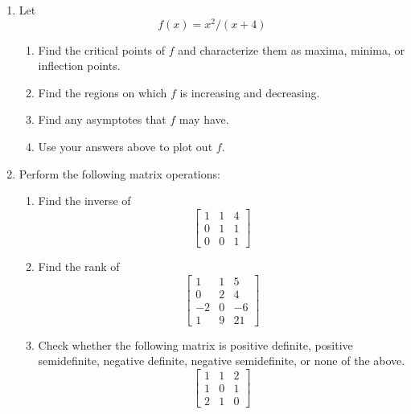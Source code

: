 \documentclass[11pt]{article}
\begin{document}
\begin{enumerate}
\vspace{.2in}
\item Let $$f(x)=x^2/(x+4)$$
\begin{enumerate}
\item Find the critical points of $f$ and characterize them as maxima, minima, or inflection points.
\item Find the regions on which $f$ is increasing and decreasing.
\item Find any asymptotes that $f$ may have.
\item Use your answers above to plot out $f$.

 
\end{enumerate}

\item Perform the following matrix operations:

\begin{enumerate}
\item Find the inverse of $$\begin{bmatrix}1 & 1& 4\\ 0& 1& 1\\0&0&1
\end{bmatrix}$$

\item Find the rank of 
$$\begin{bmatrix} 
1& 1& 5\\
0& 2& 4\\
-2& 0& -6\\
1& 9& 21
\end{bmatrix}$$


\item Check whether the following matrix is positive definite, positive semidefinite, negative definite, negative semidefinite, or none of the above.
$$\begin{bmatrix}
1& 1& 2\\1& 0& 1\\2& 1& 0
\end{bmatrix}$$
\end{enumerate}


\end{enumerate}
\end{document}
